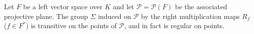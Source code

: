 Let $F$ be a left vector space over $K$ and let $\mathcal{P} = \mathcal{P}(F)$ be the associated projective plane. The group $\Sigma$ induced on $\mathcal{P}$ by the right multiplication maps $R_f$ ($f \in F^*$) is transitive on the points of $\mathcal{P}$, and in fact is regular on points.
